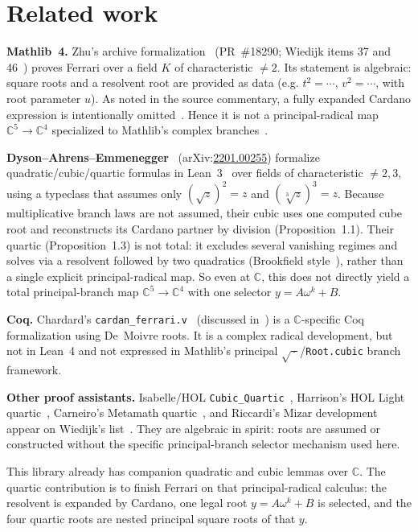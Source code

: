 \documentclass[11pt,a4paper]{article}
\newcommand{\C}{\mathbb{C}}
\begin{document}
\section{Related work}
\label{sec:related}

\textbf{Mathlib~4.}
Zhu's archive formalization~\cite{zhu2024mathlibquartic} (PR~\#18290; Wiedijk items 37 and 46~\cite{wiedijk100}) proves Ferrari over a field \(K\) of characteristic \(\neq 2\).
Its statement is algebraic: square roots and a resolvent root are provided as data (e.g.
\(t^2=\cdots\), \(v^2=\cdots\), with root parameter \(u\)).
As noted in the source commentary, a fully expanded Cardano expression is intentionally omitted~\cite{zwillinger2003}.
Hence it is not a principal-radical map \(\C^5\to\C^4\) specialized to Mathlib's complex branches~\cite{mathlib}.

\textbf{Dyson--Ahrens--Emmenegger}~\cite{dyson2022polynomials}
(arXiv:\href{https://arxiv.org/abs/2201.00255}{2201.00255})
formalize quadratic/cubic/quartic formulas in Lean~3~\cite{moura2015lean} over fields of characteristic \(\neq 2,3\), using a typeclass that assumes only
\((\sqrt{z})^2=z\) and \((\sqrt[3]{z})^3=z\).
Because multiplicative branch laws are not assumed, their cubic uses one computed cube root and reconstructs its Cardano partner by division (Proposition~1.1).
Their quartic (Proposition~1.3) is not total: it excludes several vanishing regimes and solves via a resolvent followed by two quadratics (Brookfield style~\cite{brookfield2007}), rather than a single explicit principal-radical map.
So even at \(\C\), this does not directly yield a total principal-branch map \(\C^5\to\C^4\) with one selector \(y=A\omega^k+B\).

\textbf{Coq.}
Chardard's \texttt{cardan\_ferrari.v}~\cite{chardard2021coq} (discussed in~\cite{dyson2022polynomials}) is a \(\C\)-specific Coq formalization using De~Moivre roots.
It is a complex radical development, but not in Lean~4 and not expressed in Mathlib's principal \(\sqrt{\,\cdot\,}\)/\texttt{Root.cubic} branch framework.

\textbf{Other proof assistants.}
Isabelle/{HOL} \texttt{Cubic\_Quartic}~\cite{chaieb2021isabelle}, Harrison's {HOL} Light quartic~\cite{harrisonhol}, Carneiro's Metamath quartic~\cite{carneiroquartic}, and Riccardi's Mizar development~\cite{riccardi2009} appear on Wiedijk's list~\cite{wiedijk100}.
They are algebraic in spirit: roots are assumed or constructed without the specific principal-branch selector mechanism used here.

This library already has companion quadratic and cubic lemmas over \(\C\).
The quartic contribution is to finish Ferrari on that principal-radical calculus: the resolvent is expanded by Cardano, one legal root \(y=A\omega^{k}+B\) is selected, and the four quartic roots are nested principal square roots of that \(y\).
\end{document}
